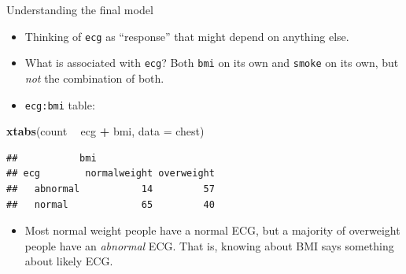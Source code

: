 \documentclass[
  ignorenonframetext,
]{beamer}
\newenvironment{Shaded}{\begin{snugshade}}{\end{snugshade}}
\newcommand{\DataTypeTok}[1]{\textcolor[rgb]{0.13,0.29,0.53}{#1}}
\newcommand{\KeywordTok}[1]{\textcolor[rgb]{0.13,0.29,0.53}{\textbf{#1}}}
\newcommand{\NormalTok}[1]{#1}
\newcommand{\OperatorTok}[1]{\textcolor[rgb]{0.81,0.36,0.00}{\textbf{#1}}}
\newcommand{\StringTok}[1]{\textcolor[rgb]{0.31,0.60,0.02}{#1}}
\providecommand{\tightlist}{%
  \setlength{\itemsep}{0pt}\setlength{\parskip}{0pt}}
\begin{document}
\begin{frame}[fragile]{Understanding the final model}
\protect\hypertarget{understanding-the-final-model}{}

\begin{itemize}
\item
  Thinking of \texttt{ecg} as ``response'' that might depend on anything
  else.
\item
  What is associated with \texttt{ecg}? Both \texttt{bmi} on its own and
  \texttt{smoke} on its own, but \emph{not} the combination of both.
\item
  \texttt{ecg:bmi} table:
\end{itemize}

\begin{Shaded}
\begin{Highlighting}[]
\KeywordTok{xtabs}\NormalTok{(count }\OperatorTok{~}\StringTok{ }\NormalTok{ecg }\OperatorTok{+}\StringTok{ }\NormalTok{bmi, }\DataTypeTok{data =}\NormalTok{ chest)}
\end{Highlighting}
\end{Shaded}

\begin{verbatim}
##           bmi
## ecg        normalweight overweight
##   abnormal           14         57
##   normal             65         40
\end{verbatim}

\begin{itemize}
\tightlist
\item
  Most normal weight people have a normal ECG, but a majority of
  overweight people have an \emph{abnormal} ECG. That is, knowing about
  BMI says something about likely ECG.
\end{itemize}

\end{frame}
\end{document}

